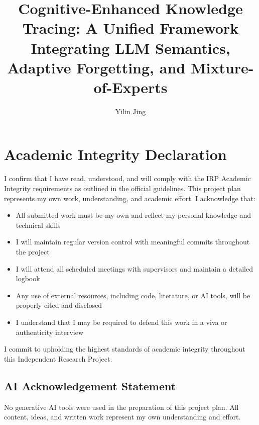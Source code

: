 \documentclass[project-plan]{report-template}
\title{Cognitive-Enhanced Knowledge Tracing: A Unified Framework Integrating LLM Semantics, Adaptive Forgetting, and Mixture-of-Experts}
\author{Yilin Jing}
\begin{document}
\maketitlepage  %

\section*{Academic Integrity Declaration}
I confirm that I have read, understood, and will comply with the IRP Academic Integrity requirements as outlined in the official guidelines. This project plan represents my own work, understanding, and academic effort. I acknowledge that:

\begin{itemize}
    \item All submitted work must be my own and reflect my personal knowledge and technical skills
    \item I will maintain regular version control with meaningful commits throughout the project
    \item I will attend all scheduled meetings with supervisors and maintain a detailed logbook
    \item Any use of external resources, including code, literature, or AI tools, will be properly cited and disclosed
    \item I understand that I may be required to defend this work in a viva or authenticity interview
\end{itemize}

I commit to upholding the highest standards of academic integrity throughout this Independent Research Project.

\subsection*{AI Acknowledgement Statement}
No generative AI tools were used in the preparation of this project plan. All content, ideas, and written work represent my own understanding and effort.
\newpage
\end{document}

